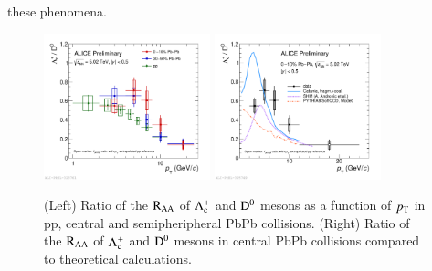 \documentclass[3p,times,procedia]{elsarticle}
\newcommand{\pt}{p_{\rm T}}
\newcommand{\Dzero}{{\rm D^0}}
\newcommand{\Lc}{{\rm \Lambda_{c}^+}}
\newcommand{\RAA}{\rm R_{AA}}
\begin{document}
these phenomena.  
\begin{figure}[h]
\includegraphics[width=0.43\textwidth]{Plots/PbPbLc/2019-10-28-LcD_PbPb18_010_3050_pp_Logx_shift.pdf}
\includegraphics[width=0.43\textwidth]{Plots/PbPbLc/2019-10-31-LcD_PbPb18_010_theory_withPythia.pdf}
\caption{
	(Left) Ratio of the $\RAA$ of $\Lc$ and $\Dzero$ mesons as a function of $\pt$ in pp, central and semipheripheral PbPb collisions. 
	(Right) Ratio of the $\RAA$ of $\Lc$ and $\Dzero$ mesons in central PbPb collisions compared to theoretical calculations.}
\label{fig:LcD0andtheory}
\end{figure}
\end{document}
